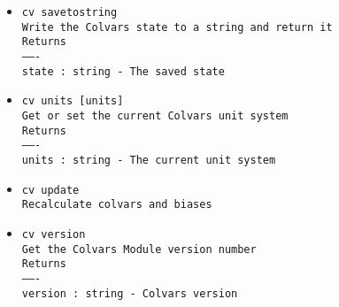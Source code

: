 \begin{itemize}
\item \texttt{cv savetostring}
\\
\texttt{Write the Colvars state to a string and return it}
\\
\texttt{Returns}
\\
\texttt{-------}
\\
\texttt{state : string - The saved state}
\item \texttt{cv units [units]}
\\
\texttt{Get or set the current Colvars unit system}
\\
\texttt{Returns}
\\
\texttt{-------}
\\
\texttt{units : string - The current unit system}
\item \texttt{cv update}
\\
\texttt{Recalculate colvars and biases}
\item \texttt{cv version}
\\
\texttt{Get the Colvars Module version number}
\\
\texttt{Returns}
\\
\texttt{-------}
\\
\texttt{version : string - Colvars version}
\end{itemize}
